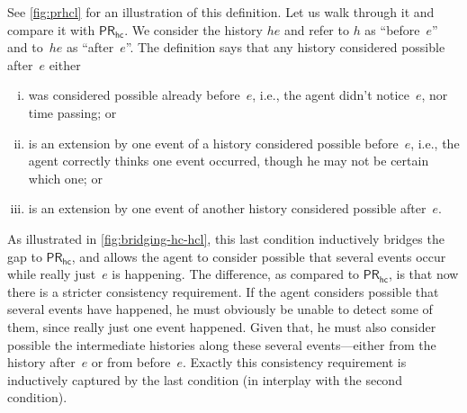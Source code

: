 \documentclass{article}
\newcommand{\PRhc}{\ensuremath{\mathsf{PR_{hc}}}\xspace}
\newcounter{#1}
\begin{document}
See \cref{fig:prhcl} for an illustration of this definition.
Let us walk through it and compare it with \PRhc.
We consider the history $he$ and refer to $h$ as ``before~$e$'' and to~$he$ as ``after~$e$''.
The definition says that any history considered possible after~$e$
either
\begin{enumerate}[(i)]
\item was considered possible already before~$e$,
  i.e., the agent didn't notice~$e$, nor time passing; or
\item is an extension by one event of a history considered possible before~$e$,
  i.e., the agent correctly thinks one event occurred, though he may not be certain which one; or
\item is an extension by one event of another history considered possible after~$e$.
\end{enumerate}
As illustrated in \cref{fig:bridging-hc-hcl}, this last condition inductively bridges the gap to \PRhc,
and allows the agent to consider possible that several events occur while really just~$e$ is happening.
The difference, as compared to \PRhc, is that now there is a stricter consistency requirement.
If the agent considers possible that several events have happened,
he must obviously be unable to detect some of them, since really just one event happened.
Given that, he must also consider possible the intermediate histories along these several events---either from the history after~$e$ or from before~$e$.
Exactly this consistency requirement is inductively captured by the last condition
(in interplay with the second condition).
\end{document}
